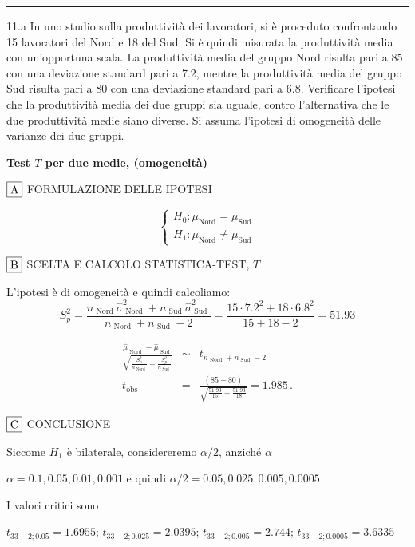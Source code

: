 \documentclass[
  11pt,
]{book}
\theoremstyle{mytheoremstyle}
\theoremstyle{mydefstyle}
\newenvironment{sol}
  {
  \begin{tcolorbox}[enhanced,breakable,arc=0.1mm,boxrule=1pt,colback=white,colframe=iblue,
  title=\bf \fontfamily{lmss}\selectfont \hspace{.5 cm} Soluzione,drop fuzzy shadow]

}{
\end{tcolorbox}
  }
\begin{document}
\begin{center}\rule{0.5\linewidth}{0.5pt}\end{center}

11.a In uno studio sulla produttività dei lavoratori, si è proceduto confrontando 15 lavoratori del Nord e 18 del Sud. Si è quindi misurata la produttività media con un'opportuna scala. La produttività media del gruppo Nord risulta pari a 85 con una deviazione standard pari a 7.2, mentre la produttività media del gruppo Sud risulta pari a 80 con una deviazione standard pari a 6.8. Verificare l'ipotesi che la produttività media dei due gruppi sia uguale, contro l'alternativa che le due produttività medie siano diverse. Si assuma l'ipotesi di omogeneità delle varianze dei due gruppi.

\begin{sol}
\textbf{Test \(T\) per due medie, (omogeneità)}

\(\fbox{A}\) FORMULAZIONE DELLE IPOTESI

\[\begin{cases}
   H_0: \mu_\text{Nord} = \mu_\text{Sud} \\
   H_1: \mu_\text{Nord} \neq \mu_\text{Sud} 
   \end{cases}\]

\(\fbox{B}\) SCELTA E CALCOLO STATISTICA-TEST, \(T\)

L'ipotesi è di omogeneità e quindi calcoliamo:\[
   S_p^2=\frac{n_\text{ Nord }\hat\sigma^2_\text{ Nord }+n_\text{ Sud }\hat\sigma^2_\text{ Sud }}{n_\text{ Nord }+n_\text{ Sud }-2} =
   \frac{ 15 \cdot 7.2 ^2+ 18 \cdot 6.8 ^2}{ 15 + 18 -2}= 51.93 
  \]

\begin{eqnarray*}
  \frac{\hat\mu_\text{ Nord } - \hat\mu_\text{ Sud }}
  {\sqrt{\frac {S^2_p}{n_\text{ Nord }}+\frac {S^2_p}{n_\text{ Sud }}}}&\sim&t_{n_\text{ Nord }+n_\text{ Sud }-2}\\
  t_{\text{obs}}
  &=& \frac{ ( 85 -  80 )} {\sqrt{\frac{ 51.93 }{ 15 }+\frac{ 51.93 }{ 18 }}}
  =   1.985 \, .
  \end{eqnarray*}

\(\fbox{C}\) CONCLUSIONE

Siccome \(H_1\) è bilaterale, considereremo \(\alpha/2\),
anziché \(\alpha\)

\(\alpha=0.1, 0.05, 0.01, 0.001\) e quindi \(\alpha/2=0.05, 0.025, 0.005, 0.0005\)

I valori critici sono

\(t_{33-2;0.05}=1.6955\); \(t_{33-2;0.025}=2.0395\); \(t_{33-2;0.005}=2.744\); \(t_{33-2;0.0005}=3.6335\)


\end{sol}
\end{document}
